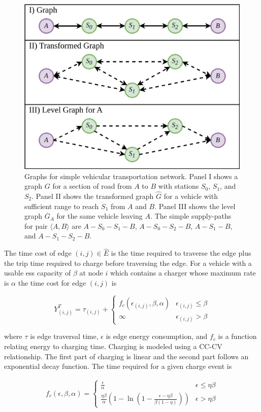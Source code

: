 \documentclass[12pt]{article}
\begin{document}
\begin{figure}[H]
	\centering
	\includegraphics[width = .7\linewidth]{figs/road_charging_paths.png}
	\caption{Graphs for simple vehicular transportation network. Panel I shows a graph $G$ for a section of road from $A$ to $B$ with stations $S_0$, $S_1$, and $S_2$. Panel II shows the transformed graph $\hat{G}$ for a vehicle with sufficient range to reach $S_1$ from $A$ and $B$. Panel III shows the level graph $\overline{G}_A$ for the same vehicle leaving $A$. The simple supply-paths for pair $\langle A, B \rangle$ are $A-S_0-S_1-B$, $A-S_0-S_2-B$, $A-S_1-B$, and $A-S_1-S_2-B$.}
	\label{fig:paths}
\end{figure}

The time cost of edge $(i, j) \in \hat{E}$ is the time required to traverse the edge plus the trip time required to charge before traversing the edge. For a vehicle with a usable \gls{ess} capacity of $\beta$ at node $i$ which contains a charger whose maximum rate is $\alpha$ the time cost for edge $(i, j)$ is

\begin{equation}
	Y^T_{(i, j)} = \tau_{(i, j)} + \begin{cases}
		f_c(\epsilon_{(i, j)}, \beta, \alpha) & \epsilon_{(i, j)} \leq \beta \\
		\infty & \epsilon_{(i, j)} > \beta
	\end{cases}
\end{equation}

where $\tau$ is edge traversal time, $\epsilon$ is edge energy consumption, and $f_c$ is a function relating energy to charging time. Charging is modeled using a CC-CV relationship. The first part of charging is linear and the second part follows an exponential decay function. The time required for a given charge event is

\begin{gather}
	f_{c}(\epsilon, \beta, \alpha) = \begin{cases}
		\frac{\epsilon}{\alpha} & \epsilon \leq \eta\beta \\
		\frac{\eta\beta}{\alpha}\left(1-\ln{\left(1-\frac{\epsilon - \eta\beta}{\beta(1-\eta)}\right)}\right) &  \epsilon > \eta\beta
	\end{cases}
\end{gather}
\end{document}
